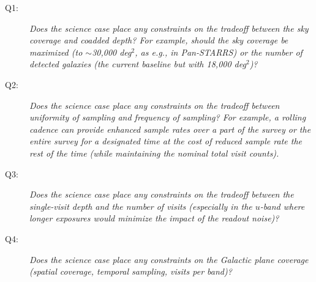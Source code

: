  \begin{description}

 \item[Q1:] {\it Does the science case place any constraints on the
 tradeoff between the sky coverage and coadded depth? For example, should
 the sky coverage be maximized (to $\sim$30,000 deg$^2$, as e.g., in
 Pan-STARRS) or the number of detected galaxies (the current baseline but
 with 18,000 deg$^2$)?}


 \item[Q2:] {\it Does the science case place any constraints on the
 tradeoff between uniformity of sampling and frequency of  sampling? For
 example, a rolling cadence can provide enhanced sample rates over a part
 of the survey or the entire survey for a designated time at the cost of
 reduced sample rate the rest of the time (while maintaining the nominal
 total visit counts).}


 \item[Q3:] {\it Does the science case place any constraints on the
 tradeoff between the single-visit depth and the number of visits
 (especially in the $u$-band where longer exposures would minimize the
 impact of the readout noise)?}


 \item[Q4:] {\it Does the science case place any constraints on the
 Galactic plane coverage (spatial coverage, temporal sampling, visits per
 band)?}


\end{description}
